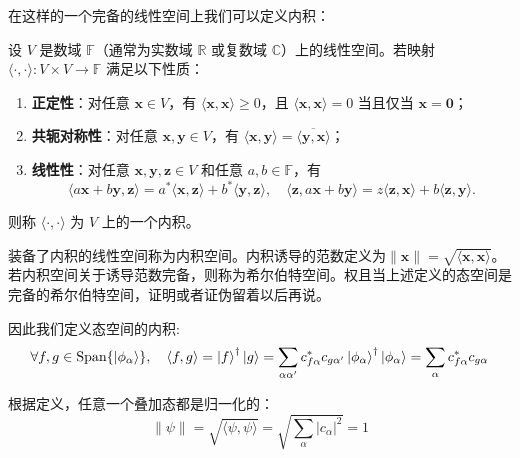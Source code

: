 在这样的一个完备的线性空间上我们可以定义内积：
\begin{definition}[内积]
设 $V$ 是数域 $\mathbb{F}$（通常为实数域 $\mathbb{R}$ 或复数域 $\mathbb{C}$）上的线性空间。若映射 $\langle \cdot, \cdot \rangle: V \times V \to \mathbb{F}$ 满足以下性质：
\begin{enumerate}
    \item \textbf{正定性}：对任意 $\mathbf{x} \in V$，有 $\langle \mathbf{x}, \mathbf{x} \rangle \geq 0$，且 $\langle \mathbf{x}, \mathbf{x} \rangle = 0$ 当且仅当 $\mathbf{x} = \mathbf{0}$；
    \item \textbf{共轭对称性}：对任意 $\mathbf{x}, \mathbf{y} \in V$，有 $\langle \mathbf{x}, \mathbf{y} \rangle = \overline{\langle \mathbf{y}, \mathbf{x} \rangle}$；
    \item \textbf{线性性}：对任意 $\mathbf{x}, \mathbf{y}, \mathbf{z} \in V$ 和任意 $a, b \in \mathbb{F}$，有
    \[
    \langle a\mathbf{x} + b\mathbf{y}, \mathbf{z} \rangle = a^*\langle \mathbf{x}, \mathbf{z} \rangle + b^*\langle \mathbf{y}, \mathbf{z} \rangle, \quad \langle \mathbf{z}, a\mathbf{x} + b\mathbf{y} \rangle = z\langle \mathbf{z}, \mathbf{x} \rangle + b\langle \mathbf{z}, \mathbf{y} \rangle.
    \]
\end{enumerate}
则称 $\langle \cdot, \cdot \rangle$ 为 $V$ 上的一个内积。
\end{definition}
装备了内积的线性空间称为内积空间。内积诱导的范数定义为$\|\mathbf{x}\| = \sqrt{\langle \mathbf{x}, \mathbf{x} \rangle}$。若内积空间关于诱导范数完备，则称为希尔伯特空间。权且当上述定义的态空间是完备的希尔伯特空间，证明或者证伪留着以后再说。

因此我们定义态空间的内积:
\[\forall f,g \in \text{Span}\{\ket{\phi_{\alpha}}\}, \quad \langle f,g \rangle=\ket{f}^{\dagger}\ket{g}=\sum_{\alpha\alpha'}c_{f\alpha}^*c_{g\alpha'}\ket{\phi_{\alpha}}^{\dagger}\ket{\phi_{\alpha}}=\sum_{\alpha}c_{f\alpha}^*c_{g\alpha}\]

根据定义，任意一个叠加态都是归一化的：
\[\|\psi\|=\sqrt{\langle\psi,\psi\rangle}=\sqrt{\sum_{\alpha}|c_{\alpha}|^2}=1\]
